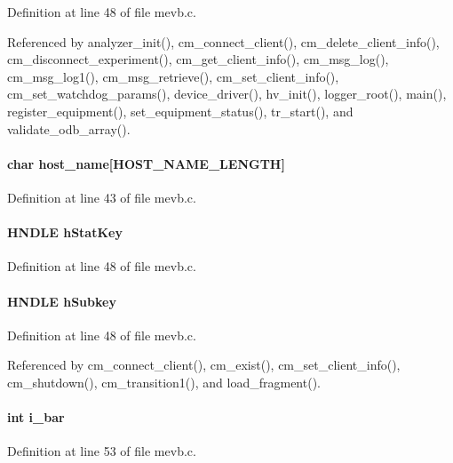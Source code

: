 Definition at line 48 of file mevb.c.

Referenced by analyzer\_\-init(), cm\_\-connect\_\-client(), cm\_\-delete\_\-client\_\-info(), cm\_\-disconnect\_\-experiment(), cm\_\-get\_\-client\_\-info(), cm\_\-msg\_\-log(), cm\_\-msg\_\-log1(), cm\_\-msg\_\-retrieve(), cm\_\-set\_\-client\_\-info(), cm\_\-set\_\-watchdog\_\-params(), device\_\-driver(), hv\_\-init(), logger\_\-root(), main(), register\_\-equipment(), set\_\-equipment\_\-status(), tr\_\-start(), and validate\_\-odb\_\-array().
\paragraph[{host\_\-name}]{\setlength{\rightskip}{0pt plus 5cm}char {\bf host\_\-name}\mbox{[}HOST\_\-NAME\_\-LENGTH\mbox{]}}\hfill\label{mevb_8c_af65cc3664520b7cd0817adc7106f9624}


Definition at line 43 of file mevb.c.
\paragraph[{hStatKey}]{\setlength{\rightskip}{0pt plus 5cm}HNDLE {\bf hStatKey}}\hfill\label{mevb_8c_aaa2f4cdc4de66789595d8d5e7f335a4e}


Definition at line 48 of file mevb.c.
\paragraph[{hSubkey}]{\setlength{\rightskip}{0pt plus 5cm}HNDLE {\bf hSubkey}}\hfill\label{mevb_8c_aac58a320ae0ebf75ec6d8a273184b463}


Definition at line 48 of file mevb.c.

Referenced by cm\_\-connect\_\-client(), cm\_\-exist(), cm\_\-set\_\-client\_\-info(), cm\_\-shutdown(), cm\_\-transition1(), and load\_\-fragment().
\paragraph[{i\_\-bar}]{\setlength{\rightskip}{0pt plus 5cm}int {\bf i\_\-bar}}\hfill\label{mevb_8c_ade74138e2dbba9881cd402a933c6a375}


Definition at line 53 of file mevb.c.

